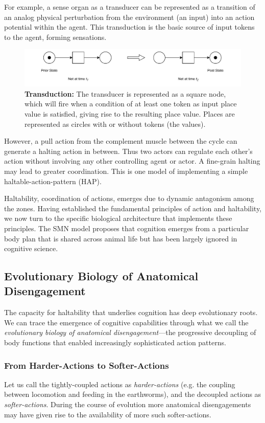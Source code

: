 For example, a sense organ as a transducer can be represented as a transition of an analog physical perturbation from the environment (an input) into an action potential within the agent. This transduction is the basic source of input tokens to the agent, forming sensations.
\begin{figure}[ht] 
\includegraphics[width=\textwidth]{graphics/PN_Transduction.pdf}
\caption{\textbf{Transduction:
}The transducer is represented as a square node, which will fire when a condition of at least one token as input place value is satisfied, giving rise to the resulting place value.
Places are represented as circles with or without tokens (the values).}
\label{transduction}
\end{figure}


However, a pull action from the complement muscle between the cycle can generate a halting action in between.  Thus two actors can regulate each other's action without involving any other controlling agent or actor. A fine-grain halting may lead to greater coordination.  This is one model of implementing a simple haltable-action-pattern (HAP). 

Haltability, coordination of actions, emerges due to dynamic antagonism among the zones. Having established the fundamental principles of action and haltability, we now turn to the specific biological architecture that implements these principles. The SMN model proposes that cognition emerges from a particular body plan that is shared across animal life but has been largely ignored in cognitive science.

\subsection{Evolutionary Biology of Anatomical Disengagement}
\label{subsec:evolutionary_disengagement}

The capacity for haltability that underlies cognition has deep evolutionary roots. We can trace the emergence of cognitive capabilities through what we call the \textit{evolutionary biology of anatomical disengagement}—the progressive decoupling of body functions that enabled increasingly sophisticated action patterns.

\subsubsection{From Harder-Actions to Softer-Actions}
Let us call the tightly-coupled actions as \textit{harder-actions} (e.g. the coupling between locomotion and feeding in the earthworms), and the decoupled actions as \textit{softer-actions}. During the course of evolution more anatomical disengagements may have given rise to the availability of more such softer-actions.

